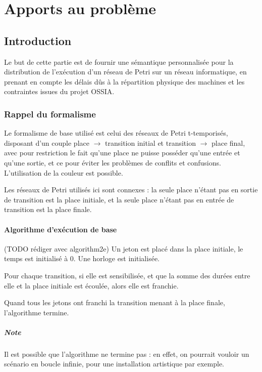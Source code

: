 \chapter{Apports au problème}
\section{Introduction}
Le but de cette partie est de fournir une sémantique  personnalisée pour la distribution de l'exécution d'un réseau de Petri sur un réseau informatique, en prenant en compte les délais dûs à la répartition physique des machines et les contraintes issues du projet \ac{OSSIA}.

\subsection{Rappel du formalisme}
Le formalisme de base utilisé est celui des réseaux de Petri t-temporisés, disposant d'un couple place $\rightarrow$ transition initial et transition $\rightarrow$ place final, avec pour restriction le fait qu'une place ne puisse posséder qu'une entrée et qu'une sortie, et ce pour éviter les problèmes de conflits et confusions. L'utilisation de la couleur est possible.

Les réseaux de Petri utilisés ici sont connexes : la seule place n'étant pas en sortie de transition est la place initiale, et la seule place n'étant pas en entrée de transition est la place finale.

\subsubsection{Algorithme d'exécution de base}
(TODO rédiger avec algorithm2e)
Un jeton est placé dans la place initiale, le temps est initialisé à 0. Une horloge est initialisée.

Pour chaque transition, si elle est sensibilisée, et que la somme des durées entre elle et la place initiale est écoulée, alors elle est franchie.

Quand tous les jetons ont franchi la transition menant à la place finale, l'algorithme termine.

\paragraph{Note} Il est possible que l'algorithme ne termine pas : en effet, on pourrait vouloir un scénario en boucle infinie, pour une installation artistique par exemple.

